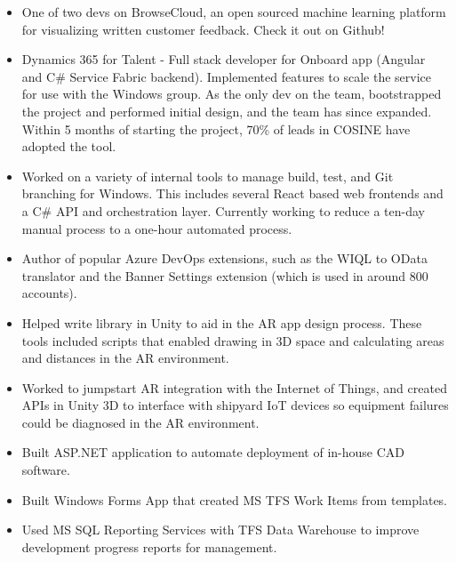 \documentclass[10pt,a4paper]{altacv}
\begin{document}
\begin{itemize}
\item One of two devs on BrowseCloud, an open sourced machine learning platform for visualizing written customer feedback. Check it out on Github!
\item Dynamics 365 for Talent - Full stack developer for Onboard app (Angular and C\# Service Fabric backend). Implemented features to scale the service for use with the Windows group. As the only dev on the team, bootstrapped the project and performed initial design, and the team has since expanded. Within 5 months of starting the project, 70\% of leads in COSINE have adopted the tool.
\item Worked on a variety of internal tools to manage build, test, and Git branching for Windows. This includes several React based web frontends and a C\# API and orchestration layer. Currently working to reduce a ten-day manual process to a one-hour automated process.
\item Author of popular Azure DevOps extensions, such as the WIQL to OData translator and the Banner Settings extension (which is used in around 800 accounts).
\end{itemize}

\divider

\begin{itemize}
\item Helped write library in Unity to aid in the AR app design process. These tools included scripts that enabled drawing in 3D space and calculating areas and distances in the AR environment. 
\item Worked to jumpstart AR integration with the Internet of Things, and created APIs in Unity 3D to interface with shipyard IoT devices so equipment failures could be diagnosed in the AR environment.
\end{itemize}

\divider


\begin{itemize}
\item Built ASP.NET application to automate deployment of in-house CAD software.
\item Built Windows Forms App that created MS TFS Work Items from templates.
\item Used MS SQL Reporting Services with TFS Data Warehouse to improve development progress reports for management.
\end{itemize}
\end{document}
